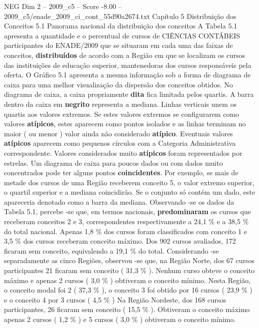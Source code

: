 \begin{textsample}{NEG Dim 2 – 2009\_c5 – Score -8.00 – 2009\_c5/enade\_2009\_ci\_cont\_55d90a2674.txt}  \label{ex:f2_neg_017}
Capítulo 5 Distribuição dos Conceitos 5.1 Panorama nacional da distribuição dos conceitos A Tabela 5.1 apresenta a quantidade e o percentual de cursos de CIÊNCIAS CONTÁBEIS participantes do ENADE/2009 que se situaram em cada uma das faixas de conceitos, \textbf{distribuídos} de acordo com a Região em que se localizam os cursos das instituições de educação superior, mantenedoras dos cursos responsáveis pela oferta.
O Gráfico 5.1 apresenta a mesma informação sob a forma de diagrama de caixa para uma melhor visualização da dispersão dos conceitos obtidos.
No diagrama de caixa, a caixa propriamente \textbf{dita} fica limitada pelos quartis.
A barra dentro da caixa em \textbf{negrito} representa a mediana.
Linhas verticais unem os quartis aos valores extremos.
Se estes valores extremos se configurarem como valores \textbf{atípicos}, estes aparecem como pontos isolados e as linhas terminam no maior ( ou menor ) valor ainda não considerado \textbf{atípico}.
Eventuais valores \textbf{atípicos} aparecem como pequenos círculos com a Categoria Administrativa correspondente.
Valores considerados muito \textbf{atípicos} foram representados por estrelas.
Um diagrama de caixa para poucos dados ou com dados muito concentrados pode ter alguns pontos \textbf{coincidentes}.
Por exemplo, se mais de metade dos cursos de uma Região receberem conceito 5, o valor extremo superior, o quartil superior e a mediana coincidirão.
Se o conjunto só contém um dado, este apareceria denotado como a barra da mediana.
Observando -se os dados da Tabela 5.1, percebe -se que, em termos nacionais, \textbf{predominaram} os cursos que receberam conceitos 2 e 3, correspondentes respectivamente a 24,1 \% e a 38,5 \% do total nacional.
Apenas 1,8 \% dos cursos foram classificados com conceito 1 e 3,5 \% dos cursos receberam conceito máximo.
Dos 902 cursos avaliados, 172 ficaram sem conceito, equivalendo a 19,1 \% do total.
Considerando -se separadamente as cinco Regiões, observou -se que, na Região Norte, dos 67 cursos participantes 21 ficaram sem conceito ( 31,3 \% ).
Nenhum curso obteve o conceito máximo e apenas 2 cursos ( 3,0 \% ) obtiveram o conceito mínimo.
Nesta Região, o conceito modal foi 2 ( 37,3 \% ), o conceito 3 foi obtido por 16 cursos ( 23,9 \% ) e o conceito 4 por 3 cursos ( 4,5 \% ) Na Região Nordeste, dos 168 cursos participantes, 26 ficaram sem conceito ( 15,5 \% ).
Obtiveram o conceito máximo apenas 2 cursos ( 1,2 \% ) e 5 cursos ( 3,0 \% ) obtiveram o conceito mínimo.

\end{textsample}
